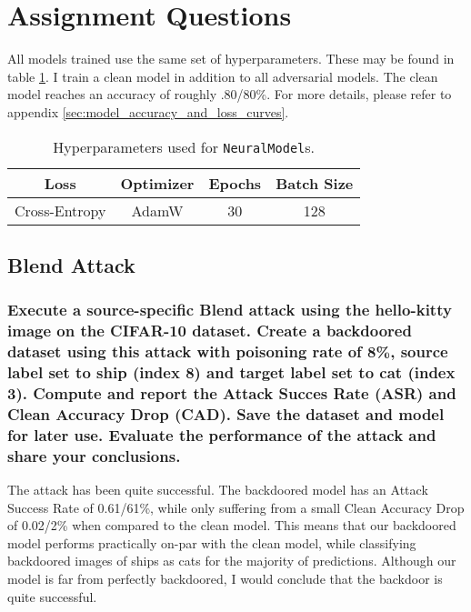 \documentclass{article}
\begin{document}
\section{Assignment Questions}
        


All models trained use the same set of hyperparameters.
These may be found in table \ref{tab:model_hyperparameters}.
I train a clean model in addition to all adversarial models.
The clean model reaches an accuracy of roughly .80/80\%.
For more details, please refer to appendix \ref{sec:model_accuracy_and_loss_curves}.
\begin{table}
    \centering
    \begin{tabular}{c|c|c|c}
        \textbf{Loss} & \textbf{Optimizer} & \textbf{Epochs} & \textbf{Batch Size} \\
        \hline
        Cross-Entropy & AdamW & 30 & 128\\
    \end{tabular}
    \caption{Hyperparameters used for \texttt{NeuralModel}s.}
    \label{tab:model_hyperparameters}
\end{table}

\subsection{Blend Attack}
\subsubsection{Execute a source-specific Blend attack using the hello-kitty image
on the CIFAR-10 dataset. Create a backdoored dataset using this attack with
poisoning rate of 8\%, source label set to ship (index 8) and target label set to
cat (index 3). Compute and report the Attack Succes Rate (ASR) and Clean
Accuracy Drop (CAD). Save the dataset and model for later use. Evaluate the
performance of the attack and share your conclusions.}
The attack has been quite successful. The backdoored model has an Attack Success Rate of 0.61/61\%, while only suffering from a small Clean Accuracy Drop of 0.02/2\% when compared to the clean model. 
This means that our backdoored model performs practically on-par with the clean model, while classifying backdoored images of ships as cats for the majority of predictions. 
Although our model is far from perfectly backdoored, I would conclude that the backdoor is quite successful.
\end{document}
